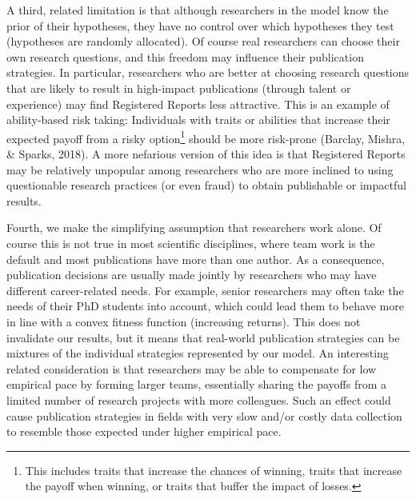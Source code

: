 \documentclass[
  british,
  a4paper,
  ,man,mask,floatsintext]{apa6}
\begin{document}
A third, related limitation is that although researchers in the model know the prior of their hypotheses, they have no control over
which hypotheses they test (hypotheses are randomly allocated).
Of course real researchers can choose their own research questions, and this freedom may influence their publication strategies.
In particular, researchers who are better at choosing research questions that are likely to result in high-impact publications (through talent or experience) may find Registered Reports less attractive.
This is an example of ability-based risk taking:
Individuals with traits or abilities that increase their expected payoff from a risky option\footnote{This includes traits that increase the chances of winning, traits that increase the payoff when winning, or traits that buffer the impact of losses.} should be more risk-prone (Barclay, Mishra, \& Sparks, 2018).
A more nefarious version of this idea is that Registered Reports may be relatively unpopular among researchers who are more inclined to using questionable research practices (or even fraud) to obtain publishable or impactful results.

Fourth, we make the simplifying assumption that researchers work alone.
Of course this is not true in most scientific disciplines, where team work is the default and most publications have more than one author.
As a consequence, publication decisions are usually made jointly by researchers who may have different career-related needs.
For example, senior researchers may often take the needs of their PhD students into account, which could lead them to behave more in line with a convex fitness function (increasing returns).
This does not invalidate our results, but it means that
real-world publication strategies can be mixtures of the individual strategies represented by our model.
An interesting related consideration is that researchers may be able to compensate for low empirical pace by forming larger teams, essentially sharing the payoffs from a limited number of research projects with more colleagues.
Such an effect could cause publication strategies in fields with very slow and/or costly data collection to resemble those expected under higher empirical pace.
\end{document}
